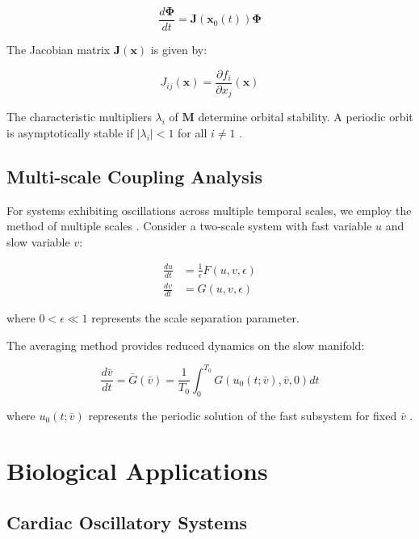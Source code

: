 \documentclass[twocolumn]{article}
\begin{document}
\begin{equation}
\frac{d\boldsymbol{\Phi}}{dt} = \mathbf{J}(\mathbf{x}_0(t))\boldsymbol{\Phi}
\label{eq:variational}
\end{equation}

The Jacobian matrix $\mathbf{J}(\mathbf{x})$ is given by:

\begin{equation}
J_{ij}(\mathbf{x}) = \frac{\partial f_i}{\partial x_j}(\mathbf{x})
\label{eq:jacobian}
\end{equation}

The characteristic multipliers $\lambda_i$ of $\mathbf{M}$ determine orbital stability. A periodic orbit is asymptotically stable if $|\lambda_i| < 1$ for all $i \neq 1$ \citep{guckenheimer1983nonlinear}.

\subsection{Multi-scale Coupling Analysis}

For systems exhibiting oscillations across multiple temporal scales, we employ the method of multiple scales \citep{nayfeh1973perturbation}. Consider a two-scale system with fast variable $u$ and slow variable $v$:

\begin{align}
\frac{du}{dt} &= \frac{1}{\epsilon}F(u,v,\epsilon) \label{eq:fast}\\
\frac{dv}{dt} &= G(u,v,\epsilon) \label{eq:slow}
\end{align}

where $0 < \epsilon \ll 1$ represents the scale separation parameter.

The averaging method provides reduced dynamics on the slow manifold:

\begin{equation}
\frac{d\bar{v}}{dt} = \bar{G}(\bar{v}) = \frac{1}{T_0} \int_0^{T_0} G(u_0(t;\bar{v}), \bar{v}, 0) dt
\label{eq:averaged}
\end{equation}

where $u_0(t;\bar{v})$ represents the periodic solution of the fast subsystem for fixed $\bar{v}$ \citep{sanders2007averaging}.

\section{Biological Applications}

\subsection{Cardiac Oscillatory Systems}
\end{document}
